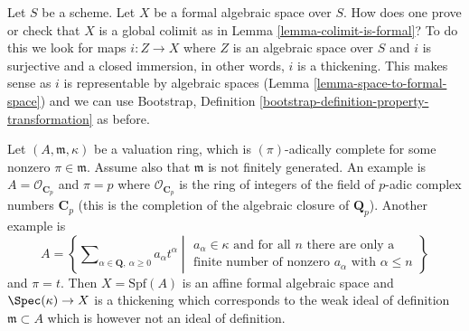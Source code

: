 \noindent
Let $S$ be a scheme. Let $X$ be a formal algebraic space over $S$.
How does one prove or check that $X$ is a global colimit as in
Lemma \ref{lemma-colimit-is-formal}? To do this we look for maps
$i : Z \to X$ where $Z$ is an algebraic space over $S$ and $i$ is
surjective and a closed immersion, in other words, $i$ is a thickening.
This makes sense as $i$ is representable by algebraic spaces
(Lemma \ref{lemma-space-to-formal-space}) and we can use
Bootstrap, Definition \ref{bootstrap-definition-property-transformation}
as before.

\begin{example}
\label{example-david-hansen}
Let $(A, \mathfrak m, \kappa)$ be a valuation ring, which is
$(\pi)$-adically complete for some nonzero $\pi \in \mathfrak m$.
Assume also that $\mathfrak m$ is not finitely generated.
An example is $A = \mathcal{O}_{\mathbf{C}_p}$ and $\pi = p$
where $\mathcal{O}_{\mathbf{C}_p}$ is the ring of integers
of the field of $p$-adic complex numbers $\mathbf{C}_p$
(this is the completion of the algebraic closure of
$\mathbf{Q}_p$). Another example is
$$
A =
\left\{
\sum\nolimits_{\alpha \in \mathbf{Q},\ \alpha \geq 0} a_\alpha t^\alpha
\middle|
\begin{matrix}
a_\alpha \in \kappa \text{ and for all }n\text{ there are only a} \\
\text{finite number of nonzero }a_\alpha
\text{ with }\alpha \leq n
\end{matrix}
\right\}
$$
and $\pi = t$. Then $X = \text{Spf}(A)$ is an affine formal algebraic
space and $\Spec(\kappa) \to X$ is a thickening which corresponds
to the weak ideal of definition $\mathfrak m \subset A$
which is however not an ideal of definition.
\end{example}

